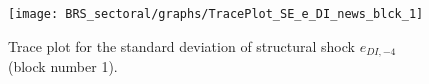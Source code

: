 \begin{figure}[H]
\centering
  \texttt{[image: BRS\_sectoral/graphs/TracePlot\_SE\_e\_DI\_news\_blck\_1]}\\
    \caption{Trace plot for the standard deviation of structural shock ${e_{DI,-4}}$ (block number 1).}
\end{figure}
